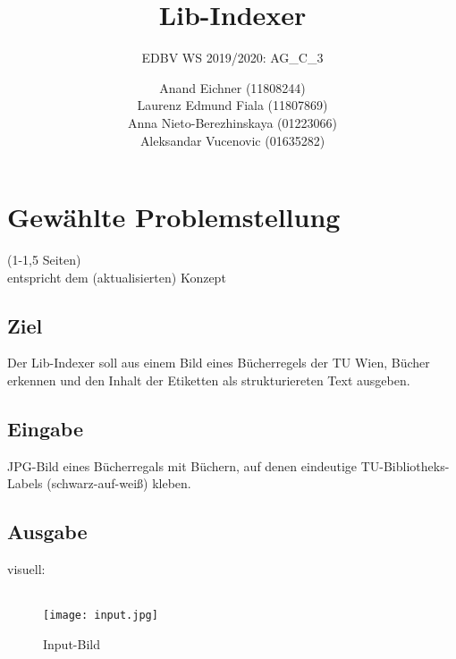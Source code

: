 \documentclass[paper=A4, deutsch]{scrartcl}
\begin{document}

\title{Lib-Indexer} %

\subtitle{EDBV WS 2019/2020: AG\_C\_3} %


\author{Anand Eichner (11808244)\\
Laurenz Edmund Fiala (11807869)\\
Anna Nieto-Berezhinskaya (01223066)\\
Aleksandar Vucenovic (01635282)}




\maketitle


\section{Gewählte Problemstellung}
(1-1,5 Seiten)\\
entspricht dem (aktualisierten) Konzept
\subsection{Ziel}
Der Lib-Indexer soll aus einem Bild eines Bücherregels der TU Wien, Bücher erkennen und den Inhalt der Etiketten als strukturiereten Text ausgeben.

\subsection{Eingabe}
JPG-Bild eines Bücherregals mit Büchern, auf denen eindeutige TU-Bibliotheks-Labels (schwarz-auf-weiß) kleben.

\subsection{Ausgabe}
visuell:\\
\\
\begin{figure}[H]
 \centering
 \texttt{[image: input.jpg]}
 \caption{Input-Bild}
 \label{fig:img}
\end{figure}
\end{document}

